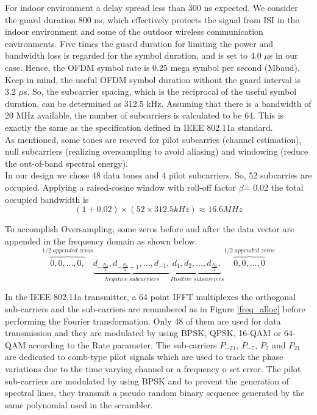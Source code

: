 For indoor environment a delay spread less than 300 ns expected. We consider the guard duration 800 ns, which effectively protects the signal from ISI in the indoor environment and some of the outdoor wireless communication environments. Five times the guard duration for limiting the power and bandwidth loss is regarded for the symbol duration, and is set to 4.0 $\mu$s in our case. Hence, the OFDM symbol rate is 0.25 mega symbol per second (Mbaud).\\
Keep in mind, the useful OFDM symbol duration without the guard interval is 3.2 $\mu$s. So, the subcarrier spacing, which is the reciprocal of the useful symbol duration, can be determined as 312.5 kHz. Assuming that there is a bandwidth of 20 MHz available, the number of subcarriers is calculated to be 64. This is exactly the same as the specification defined in IEEE 802.11a standard.\\
As mentioned, some tones are reseved for pilot subcarries (channel estimation), null subcarriers (realizing oversampling to avoid aliasing) and windowing (reduce the out-of-band spectral energy).\\
In our design we chose 48 data tones and 4 pilot subcarriers. So, 52 subcarries are occupied. Applying a raised-cosine window with roll-off factor $\beta$= 0.02 the total occupied bandwidth is\\

\begin{equation} \label{occupied_bw}
(1+ 0.02)\times(52 \times 312.5kHz) \approx 16.6MHz
\end{equation}

To accomplish Oversampling, some zeros before and after the data vector are appended in the frequency domain as shown below.\\

\begin{equation} \label{over_sample}
\overbrace{0, 0, ... , 0,}^{1/2\;appended\;zeros}
\underbrace{d_{-\frac{N_d}{2}}, d_{-\frac{N_d}{2}+1}, ... , d_{-1},}_{Negative\;subcarriers}
\underbrace{d_{1}, d_{2}, ... , d_{\frac{N_d}{2}},}_{Positive\;subcarriers}
\overbrace{0, 0, ... , 0}^{1/2\;appended\;zeros}
\end{equation}

In the IEEE 802.11a transmitter, a 64 point IFFT multiplexes the orthogonal sub-carriers and the sub-carriers are renumbered as in Figure \ref{freq_alloc} before performing the Fourier transformation. Only 48 of them are used for data transmission and they are modulated by using BPSK, QPSK, 16-QAM or 64-QAM according to the Rate parameter. The sub-carriers $P_{-21}$, $P_{-7}$, $P_{7}$ and $P_{21}$ are dedicated to comb-type pilot signals which are used to track the phase variations due to the time varying channel or a frequency o set error. The pilot sub-carriers are modulated by using BPSK and to prevent the generation of spectral lines, they transmit a pseudo random binary sequence generated by the same polynomial used in the scrambler.\\

